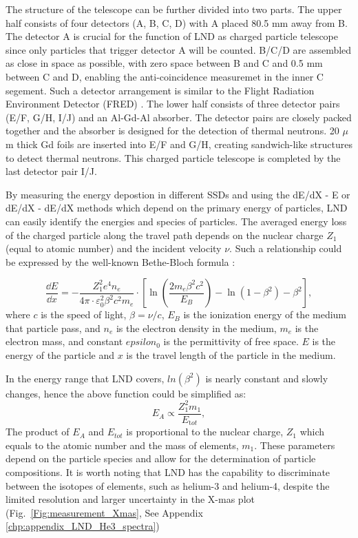 The structure of the telescope can be further divided into two parts. The upper half consists of four detectors (A, B, C, D) with A placed 80.5 mm away from B. The detector A is crucial for the function of \ac{LND} as charged particle telescope since only particles that trigger detector A will be counted. B/C/D are assembled as close in space as possible, with zero space between B and C and 0.5 mm between C and D, enabling the anti-coincidence measuremet in the inner C segement. Such a detector arrangement is similar to the Flight Radiation Environment Detector (FRED) \citep{moeller-etal-2013, moeller-etal-2013b}. The lower half consists of three detector pairs (E/F, G/H, I/J) and an Al-Gd-Al absorber. The detector pairs are closely packed together and the absorber is designed for the detection of thermal neutrons. 20 $\mu$m thick Gd foils are inserted into E/F and G/H, creating sandwich-like structures to detect thermal neutrons. This charged particle telescope is completed by the last detector pair I/J.

By measuring the energy depostion in different \acp{SSD} and using the dE/dX - E or dE/dX - dE/dX methods which depend on the primary energy of particles, LND can easily identify the energies and species of particles. 
The averaged energy loss of the charged particle along the travel path depends on the nuclear charge $Z_1$ (equal to atomic number) and the incident velocity $\nu$. 
Such a relationship could be expressed by the well-known Bethe-Bloch formula \citep{bethe-1930, bloch-1933}:

\begin{equation}
    \frac{\dd E}{\dd x} = - \frac{Z_1^2 e^4 n_e}{4 \pi \cdot \varepsilon_0^2 \beta^2 c^2 m_e} \cdot \left[ \ln\left(\frac{2 m_e  \beta^2 c^2}{{E_B}}\right) - \ln(1 - \beta^2) - \beta^2  \right], 
    \label{eq:BB}
  \end{equation}
where $c$ is the speed of light, $\beta = \nu/c$, $E_B$ is the ionization energy of the medium that particle pass, and $n_e$ is the electron density in the medium, $m_e$ is the electron mass, and constant $epsilon_0$ is the permittivity of free space. $E$ is the energy of the particle and $x$ is the travel length of the particle in the medium.

In the energy range that \ac{LND} covers, $ln(\beta^2)$ is nearly constant and slowly changes, hence the above function could be simplified as:
\begin{equation}
    E_A \propto \frac{Z_1^2 m_1}{E_{\mathrm tot}},
    \label{eq:BB2}
\end{equation}
The product of $E_A$ and $E_{tot}$ is proportional to the nuclear charge, $Z_1$ which equals to the atomic number and the mass of elements, $m_1$. These parameters depend on the particle species and allow for the determination of particle compositions. It is worth noting that \ac{LND} has the capability to discriminate between the isotopes of elements, such as helium-3 and helium-4, despite the limited resolution and larger uncertainty in the X-mas plot (Fig.~\ref{Fig:measurement_Xmas}, See Appendix \ref{chp:appendix_LND_He3_spectra})

